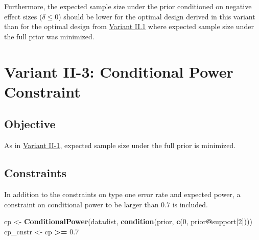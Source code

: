 \documentclass[
]{book}
\newenvironment{Shaded}{\begin{snugshade}}{\end{snugshade}}
\newcommand{\DecValTok}[1]{\textcolor[rgb]{0.00,0.00,0.81}{#1}}
\newcommand{\FloatTok}[1]{\textcolor[rgb]{0.00,0.00,0.81}{#1}}
\newcommand{\KeywordTok}[1]{\textcolor[rgb]{0.13,0.29,0.53}{\textbf{#1}}}
\newcommand{\NormalTok}[1]{#1}
\newcommand{\OperatorTok}[1]{\textcolor[rgb]{0.81,0.36,0.00}{\textbf{#1}}}
\newcommand{\StringTok}[1]{\textcolor[rgb]{0.31,0.60,0.02}{#1}}
\begin{document}
Furthermore, the expected sample size under the prior conditioned on negative
effect sizes (\(\delta \leq 0\)) should be lower for the optimal design derived
in this variant than for the optimal design from \protect\hyperlink{variantII_1}{Variant II.1}
where expected sample size under the full prior was minimized.

\begin{Shaded}
\end{Shaded}

\hypertarget{variantII_3}{%
\section{Variant II-3: Conditional Power Constraint}\label{variantII_3}}

\hypertarget{objective-5}{%
\subsection{Objective}\label{objective-5}}

As in \protect\hyperlink{variantII_1}{Variant II-1}, expected sample size under the full prior
is minimized.

\hypertarget{constraints-5}{%
\subsection{Constraints}\label{constraints-5}}

In addition to the constraints on type one error rate and expected power,
a constraint on conditional power to be larger than \(0.7\) is included.

\begin{Shaded}
\begin{Highlighting}[]
\NormalTok{cp       <-}\StringTok{ }\KeywordTok{ConditionalPower}\NormalTok{(datadist, }\KeywordTok{condition}\NormalTok{(prior, }\KeywordTok{c}\NormalTok{(}\DecValTok{0}\NormalTok{, prior}\OperatorTok{@}\NormalTok{support[}\DecValTok{2}\NormalTok{])))}
\NormalTok{cp_cnstr <-}\StringTok{ }\NormalTok{cp }\OperatorTok{>=}\StringTok{ }\FloatTok{0.7}
\end{Highlighting}
\end{Shaded}
\end{document}
